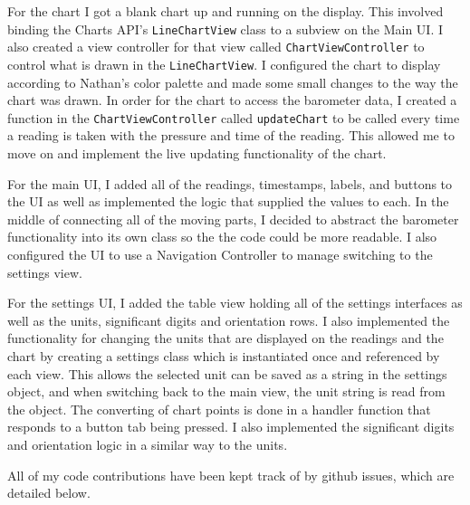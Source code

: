 \documentclass[onecolumn, draftclsnofoot,10pt, compsoc]{IEEEtran}
\begin{document}
        For the chart I got a blank chart up and running on the display.
        This involved binding the Charts API's \texttt{LineChartView} class to a subview on the Main UI.
        I also created a view controller for that view called \texttt{ChartViewController} to control what is drawn in the \texttt{LineChartView}.
        I configured the chart to display according to Nathan's color palette and made some small changes to the way the chart was drawn.
        In order for the chart to access the barometer data, I created a function in the \texttt{ChartViewController} called \texttt{updateChart} to be called every time a reading is taken with the pressure and time of the reading.
        This allowed me to move on and implement the live updating functionality of the chart.

        For the main UI, I added all of the readings, timestamps, labels, and buttons to the UI as well as implemented the logic that supplied the values to each.
        In the middle of connecting all of the moving parts, I decided to abstract the barometer functionality into its own class so the the code could be more readable.
        I also configured the UI to use a Navigation Controller to manage switching to the settings view.

        For the settings UI, I added the table view holding all of the settings interfaces as well as the units, significant digits and orientation rows.
        I also implemented the functionality for changing the units that are displayed on the readings and the chart by creating a settings class which is instantiated once and referenced by each view.
        This allows the selected unit can be saved as a string in the settings object, and when switching back to the main view, the unit string is read from the object.
        The converting of chart points is done in a handler function that responds to a button tab being pressed.
        I also implemented the significant digits and orientation logic in a similar way to the units.

        All of my code contributions have been kept track of by github issues, which are detailed below.
\end{document}
